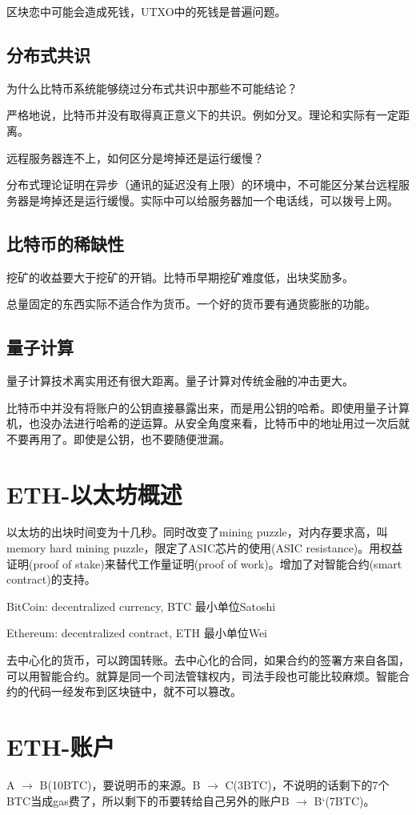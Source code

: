 \documentclass[10pt]{ctexart}
\begin{document}
区块恋中可能会造成死钱，UTXO中的死钱是普遍问题。
\subsection{分布式共识}
为什么比特币系统能够绕过分布式共识中那些不可能结论？

严格地说，比特币并没有取得真正意义下的共识。例如分叉。理论和实际有一定距离。

远程服务器连不上，如何区分是垮掉还是运行缓慢？

分布式理论证明在异步（通讯的延迟没有上限）的环境中，不可能区分某台远程服务器是垮掉还是运行缓慢。实际中可以给服务器加一个电话线，可以拨号上网。

\subsection{比特币的稀缺性}
挖矿的收益要大于挖矿的开销。比特币早期挖矿难度低，出块奖励多。

总量固定的东西实际不适合作为货币。一个好的货币要有通货膨胀的功能。

\subsection{量子计算}
量子计算技术离实用还有很大距离。量子计算对传统金融的冲击更大。

比特币中并没有将账户的公钥直接暴露出来，而是用公钥的哈希。即使用量子计算机，也没办法进行哈希的逆运算。从安全角度来看，比特币中的地址用过一次后就不要再用了。即使是公钥，也不要随便泄漏。

\section{ETH-以太坊概述}
以太坊的出块时间变为十几秒。同时改变了mining puzzle，对内存要求高，叫memory hard mining puzzle，限定了ASIC芯片的使用(ASIC resistance)。用权益证明(proof of stake)来替代工作量证明(proof of work)。增加了对智能合约(smart contract)的支持。

BitCoin: decentralized currency, BTC 最小单位Satoshi

Ethereum: decentralized contract, ETH 最小单位Wei

去中心化的货币，可以跨国转账。去中心化的合同，如果合约的签署方来自各国，可以用智能合约。就算是同一个司法管辖权内，司法手段也可能比较麻烦。智能合约的代码一经发布到区块链中，就不可以篡改。

\section{ETH-账户}
A $\rightarrow$ B(10BTC)，要说明币的来源。B $\rightarrow$ C(3BTC)，不说明的话剩下的7个BTC当成gas费了，所以剩下的币要转给自己另外的账户B $\rightarrow$ B‘(7BTC)。
\end{document}
